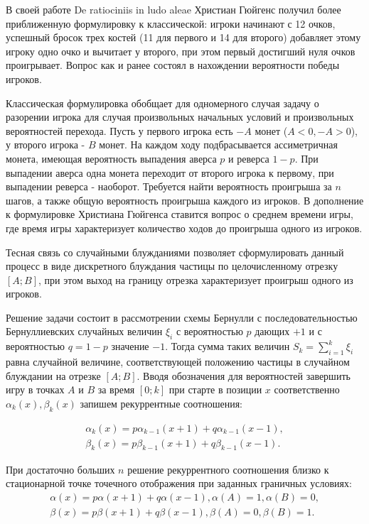 В своей работе De ratiociniis in ludo aleae Христиан Гюйгенс получил более приближенную формулировку к классической: игроки начинают с 12 очков, успешный бросок 
трех костей (11 для первого и 14 для второго) добавляет этому игроку одно очко и вычитает у второго, при этом первый достигший нуля очков проигрывает.
Вопрос как и ранее состоял в нахождении вероятности победы игроков. 

Классическая формулировка обобщает для одномерного случая задачу о разорении игрока для случая произвольных начальных условий и произвольных вероятностей перехода. 
Пусть у первого игрока есть $-A$ монет ($A < 0, -A > 0$), у второго игрока - $B$ монет. На каждом ходу подбрасывается ассиметричная монета, имеющая вероятность выпадения 
аверса $p$ и реверса $1-p$. При выпадении аверса одна монета переходит от второго игрока к первому, при выпадении реверса - наоборот. Требуется найти вероятность проигрыша 
за $n$ шагов, а также общую вероятность проигрыша каждого из игроков. В дополнение к формулировке Христиана Гюйгенса ставится вопрос о среднем времени игры, 
где время игры характеризует количество ходов до проигрыша одного из игроков.

Тесная связь со случайными блужданиями позволяет сформулировать данный процесс в виде дискретного блуждания частицы по целочисленному отрезку $[A; B]$, 
при этом выход на границу отрезка характеризует проигрыш одного из игроков. 

Решение задачи состоит в рассмотрении схемы Бернулли с последовательностью Бернуллиевских случайных величин $\xi_i$ с вероятностью $p$ дающих $+1$ и 
с вероятностью $q=1-p$ значение $-1$.
Тогда сумма таких величин $S_k=\sum_{i=1}^{k} \xi_i$ равна случайной величине, соответствующей положению частицы в случайном блуждании на отрезке $[A; B]$.
Вводя обозначения для вероятностей завершить игру в точках $A$ и $B$ за время $[0; k]$ при старте в позиции $x$ соответственно $\alpha_k(x), \beta_k(x)$ 
запишем рекуррентные соотношения:

\begin{equation}
    \label{eq:eq1}
    \begin{alignedat}{2}
        \alpha_k(x) = p\alpha_{k-1}(x+1)+q\alpha_{k-1}(x-1),\\
        \beta_k(x) = p\beta_{k-1}(x+1)+q\beta_{k-1}(x-1).
    \end{alignedat}
\end{equation}

При достаточно больших $n$ решение рекуррентного соотношения близко к стационарной точке точечного отображения при заданных граничных условиях:
\begin{equation}
    \label{eq:eq2}
    \begin{alignedat}{2}
        \alpha(x) = p\alpha(x+1)+q\alpha(x-1), \alpha(A)=1, \alpha(B)=0,\\
        \beta(x) = p\beta(x+1)+q\beta(x-1), \beta(A)=0, \beta(B)=1.
    \end{alignedat}
\end{equation}

